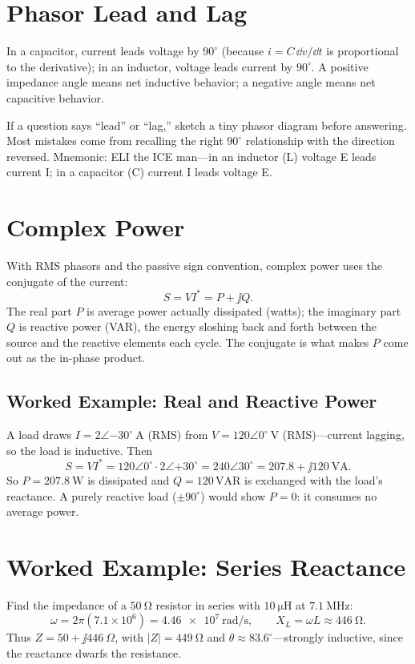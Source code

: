 \section{Phasor Lead and Lag}
In a capacitor, current leads voltage by \(90^\circ\) (because
\(i=C\,\dd v/\dd t\) is proportional to the derivative); in an inductor, voltage
leads current by \(90^\circ\). A positive impedance angle means net inductive
behavior; a negative angle means net capacitive behavior.

\begin{exambox}
If a question says ``lead'' or ``lag,'' sketch a tiny phasor diagram before
answering. Most mistakes come from recalling the right \(90^\circ\) relationship
with the direction reversed. Mnemonic: ELI the ICE man---in an inductor (L)
voltage E leads current I; in a capacitor (C) current I leads voltage E.
\end{exambox}

\section{Complex Power}
With RMS phasors and the passive sign convention, complex power uses the
conjugate of the current:
\[
S=V I^{*}=P+\jj Q .
\]
The real part \(P\) is average power actually dissipated (watts); the imaginary
part \(Q\) is reactive power (VAR), the energy sloshing back and forth between the
source and the reactive elements each cycle. The conjugate is what makes \(P\)
come out as the in-phase product.

\subsection{Worked Example: Real and Reactive Power}
A load draws \(I=2\angle{-30^\circ}\ \si{\ampere}\) (RMS) from
\(V=120\angle0^\circ\ \si{\volt}\) (RMS)---current lagging, so the load is
inductive. Then
\[
S=VI^{*}=120\angle0^\circ\cdot 2\angle{+30^\circ}=240\angle30^\circ
=207.8+\jj120\ \mathrm{VA}.
\]
So \(P=\SI{207.8}{\watt}\) is dissipated and \(Q=120\,\mathrm{VAR}\) is exchanged with
the load's reactance. A purely reactive load (\(\pm90^\circ\)) would show
\(P=0\): it consumes no average power.

\section{Worked Example: Series Reactance}
Find the impedance of a \(\SI{50}{\ohm}\) resistor in series with
\(\SI{10}{\micro\henry}\) at \(\SI{7.1}{\mega\hertz}\):
\[
\omega=2\pi(7.1\times10^6)=\SI{4.46e7}{\radian\per\second},
\qquad
X_L=\omega L\approx\SI{446}{\ohm}.
\]
Thus \(Z=50+\jj446\ \Omega\), with \(|Z|=\SI{449}{\ohm}\) and
\(\theta\approx83.6^\circ\)---strongly inductive, since the reactance dwarfs the
resistance.
